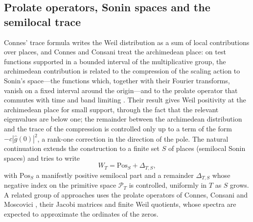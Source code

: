 \documentclass[11pt]{amsart}
\theoremstyle{definition}
\theoremstyle{remark}
\numberwithin{equation}{section}
\newcommand{\PT}{\mathcal{P}_T}                        %
\newcommand{\WT}{W_T}                                  %
\begin{document}
\subsection{Prolate operators, Sonin spaces and the semilocal trace}
\label{w6:sec:prolate}\label{w6:fam:R15}

Connes' trace formula \cite{Connes1999} writes the Weil distribution as a sum of local
contributions over places, and Connes and Consani \cite{ConnesConsani2021} treat the archimedean
place: on test functions supported in a bounded interval of the multiplicative group, the
archimedean contribution is related to the compression of the scaling action to Sonin's space---the
functions which, together with their Fourier transforms, vanish on a fixed interval around the
origin---and to the prolate operator that commutes with time and band limiting
\cite{SlepianPollak1961,LandauWidom1980}. Their result gives Weil positivity at the archimedean
place for small support, through the fact that the relevant eigenvalues are below one; the
remainder between the archimedean distribution and the trace of the compression is controlled only
up to a term of the form $-c|\widehat g(0)|^2$, a rank-one correction in the direction of the pole.
The natural continuation extends the construction to a finite set $S$ of places (semilocal Sonin
spaces) and tries to write
\[
\WT=\mathrm{Pos}_{S}+\Delta_{T,S},
\]
with $\mathrm{Pos}_S$ a manifestly positive semilocal part and a remainder $\Delta_{T,S}$ whose
negative index on the primitive space $\PT$ is controlled, uniformly in $T$ as $S$ grows. A related
group of approaches uses the prolate operators of Connes, Consani and Moscovici \cite{CCM2024},
their Jacobi matrices and finite Weil quotients, whose spectra are expected to approximate the
ordinates of the zeros.
\end{document}

